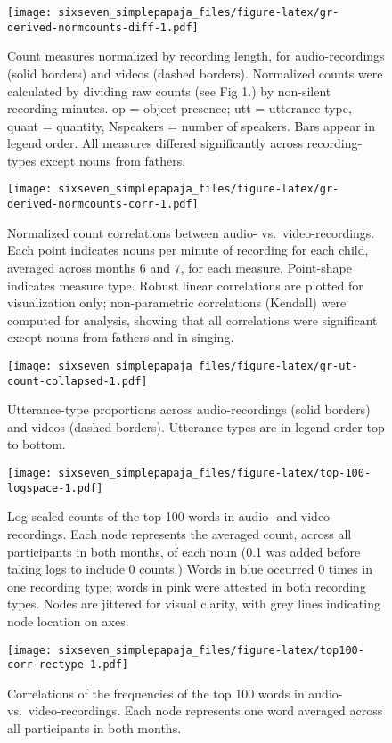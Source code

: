 \documentclass[man]{apa6}
\theoremstyle{definition}
\theoremstyle{definition}
\theoremstyle{definition}
\theoremstyle{remark}
\begin{document}
\begin{figure}
\centering
\texttt{[image: sixseven\_simplepapaja\_files/figure-latex/gr-derived-normcounts-diff-1.pdf]}
\caption{\label{fig:gr-derived-normcounts-diff}Count measures normalized by
recording length, for audio-recordings (solid borders) and videos
(dashed borders). Normalized counts were calculated by dividing raw
counts (see Fig 1.) by non-silent recording minutes. op = object
presence; utt = utterance-type, quant = quantity, Nspeakers = number of
speakers. Bars appear in legend order. All measures differed
significantly across recording-types except nouns from fathers.}
\end{figure}

\begin{figure}
\centering
\texttt{[image: sixseven\_simplepapaja\_files/figure-latex/gr-derived-normcounts-corr-1.pdf]}
\caption{\label{fig:gr-derived-normcounts-corr}Normalized count correlations
between audio- vs.~video-recordings. Each point indicates nouns per
minute of recording for each child, averaged across months 6 and 7, for
each measure. Point-shape indicates measure type. Robust linear
correlations are plotted for visualization only; non-parametric
correlations (Kendall) were computed for analysis, showing that all
correlations were significant except nouns from fathers and in singing.}
\end{figure}

\begin{figure}
\centering
\texttt{[image: sixseven\_simplepapaja\_files/figure-latex/gr-ut-count-collapsed-1.pdf]}
\caption{\label{fig:gr-ut-count-collapsed}Utterance-type proportions across
audio-recordings (solid borders) and videos (dashed borders).
Utterance-types are in legend order top to bottom.}
\end{figure}

\begin{figure}
\centering
\texttt{[image: sixseven\_simplepapaja\_files/figure-latex/top-100-logspace-1.pdf]}
\caption{\label{fig:top-100-logspace}Log-scaled counts of the top 100 words
in audio- and video-recordings. Each node represents the averaged count,
across all participants in both months, of each noun (0.1 was added
before taking logs to include 0 counts.) Words in blue occurred 0 times
in one recording type; words in pink were attested in both recording
types. Nodes are jittered for visual clarity, with grey lines indicating
node location on axes.}
\end{figure}

\begin{figure}
\centering
\texttt{[image: sixseven\_simplepapaja\_files/figure-latex/top100-corr-rectype-1.pdf]}
\caption{\label{fig:top100-corr-rectype}Correlations of the frequencies of
the top 100 words in audio- vs.~video-recordings. Each node represents
one word averaged across all participants in both months.}
\end{figure}
\end{document}
